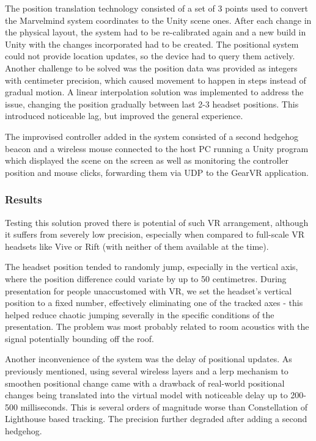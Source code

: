 \documentclass[12pt, a4paper]{article}
\begin{document}
The position translation technology consisted of a set of 3 points used to convert the Marvelmind system coordinates to the Unity scene ones. After each change in the physical layout, the system had to be re-calibrated again and a new build in Unity with the changes incorporated had to be created. The positional system could not provide location updates, so the device had to query them actively. Another challenge to be solved was the position data was provided as integers with centimeter precision, which caused movement to happen in steps instead of gradual motion. A linear interpolation solution was implemented to address the issue, changing the position gradually between last 2-3 headset positions. This introduced noticeable lag, but improved the general experience.

The improvised controller added in the system consisted of a second hedgehog beacon and a wireless mouse connected to the host PC running a Unity program which displayed the scene on the screen as well as monitoring the controller position and mouse clicks, forwarding them via UDP to the GearVR application.

\subsubsection{Results}
Testing this solution proved there is potential of such VR arrangement, although it suffers from severely low precision, especially when compared to full-scale VR headsets like Vive or Rift (with neither of them available at the time).

The headset position tended to randomly jump, especially in the vertical axis, where the position difference could variate by up to 50 centimetres. During presentation for people unaccustomed with VR, we set the headset’s vertical position to a fixed number, effectively eliminating one of the tracked axes - this helped reduce chaotic jumping severally in the specific conditions of the presentation. The problem was most probably related to room acoustics with the signal potentially bounding off the roof.

Another inconvenience of the system was the delay of positional updates. As previously mentioned, using several wireless layers and a lerp mechanism to smoothen positional change came with a drawback of real-world positional changes being translated into the virtual model with noticeable delay up to 200-500 milliseconds. This is several orders of magnitude worse than Constellation of Lighthouse based tracking. The precision further degraded after adding a second hedgehog.
\end{document}
